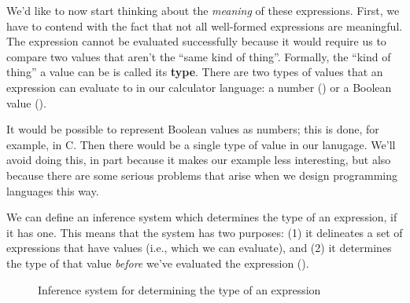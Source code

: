 We'd like to now start thinking about the \textit{meaning} of these expressions.
First, we have to contend with the fact that not all well-formed expressions are meaningful.
The expression
cannot be evaluated successfully because it would require us to compare two values that aren't the \enquote{same kind of thing}.
Formally, the \enquote{kind of thing} a value can be is called its \textbf{type}.
There are two types of values that an expression can evaluate to in our calculator language: a number () or a Boolean value ().

\begin{remark}
  It would be possible to represent Boolean values as numbers; this is done, for example, in C.
  Then there would be a single type of value in our lanugage.
  We'll avoid doing this, in part because it makes our example less interesting, but also because there are some serious problems that arise when we design programming languages this way.
\end{remark}
%
We can define an inference system which determines the type of an expression, if it has one.
This means that the system has two purposes: (1) it delineates a set of expressions that have values (i.e., which we can evaluate), and (2) it determines the type of that value \textit{before} we've evaluated the expression ().

\begin{figure}
  \caption{Inference system for determining the type of an expression}
  \label{fig:calc-ty-sys}
\end{figure}

